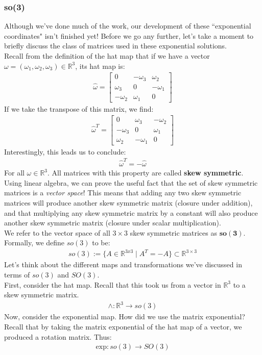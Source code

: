 \documentclass[oneside]{book}
\begin{document}
\subsubsection{so(3)}
Although we've done much of the work, our development of these ``exponential coordinates" isn't finished yet! Before we go any further, let's take a moment to briefly discuss the class of matrices used in these exponential solutions.\\
Recall from the definition of the hat map that if we have a vector $\omega = (\omega_1, \omega_2, \omega_3)\in \mathbb{R}^3$, its hat map is:
\begin{align}
    \hat\omega  = \begin{bmatrix}
    0 & -\omega_3 & \omega_2\\
    \omega_3 & 0 & -\omega_1\\
    -\omega_2 & \omega_1 & 0
    \end{bmatrix}
\end{align}
If we take the transpose of this matrix, we find:
\begin{align}
    \hat\omega^T = 
    \begin{bmatrix}
    0 & \omega_3 & -\omega_2\\
    -\omega_3 & 0 & \omega_1\\
    \omega_2 & -\omega_1 & 0
    \end{bmatrix}
\end{align}
Interestingly, this leads us to conclude:
\begin{align}
    \hat{\omega}^T = -\hat\omega
\end{align}
For all $\omega \in \mathbb{R}^3$. All matrices with this property are called \textbf{skew symmetric}.\\
Using linear algebra, we can prove the useful fact that the set of skew symmetric matrices is a \textit{vector space}! This means that adding any two skew symmetric matrices will produce another skew symmetric matrix (closure under addition), and that multiplying any skew symmetric matrix by a constant will also produce another skew symmetric matrix (closure under scalar multiplication).\\
We refer to the vector space of all $3\times 3$ skew symmetric matrices as $\mathbf{so(3)}$. Formally, we define $so(3)$ to be:
\begin{align}
    so(3) := \{A \in \mathbb{R}^{3x3} \;| \; A^T = -A\} \subset \mathbb{R}^{3\times 3}
\end{align}
Let's think about the different maps and transformations we've discussed in terms of $so(3)$ and $SO(3)$.\\
First, consider the hat map. Recall that this took us from a vector in $\mathbb{R}^3$ to a skew symmetric matrix.
\begin{align}
    \wedge: \mathbb{R}^3 \to so(3)
\end{align}
Now, consider the exponential map. How did we use the matrix exponential? Recall that by taking the matrix exponential of the hat map of a vector, we produced a rotation matrix. Thus:
\begin{align}
    \mathrm{exp}: so(3) \to SO(3)
\end{align}
\end{document}
